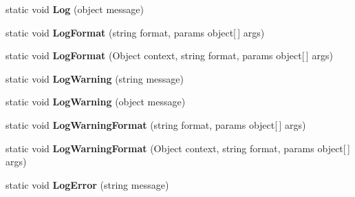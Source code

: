 \begin{DoxyCompactItemize}
\item 
\mbox{\label{class_lerp2_a_p_i_1_1_debug_handler_1_1_debug_a475bac2cd5b9b1be7c7b2b538f023536}} 
static void {\bfseries Log} (object message)
\item 
\mbox{\label{class_lerp2_a_p_i_1_1_debug_handler_1_1_debug_a9cb2534de671e4e858f133220c32419a}} 
static void {\bfseries Log\+Format} (string format, params object\mbox{[}$\,$\mbox{]} args)
\item 
\mbox{\label{class_lerp2_a_p_i_1_1_debug_handler_1_1_debug_a3b527f81ce961ce00998ea4e9e24b2cf}} 
static void {\bfseries Log\+Format} (Object context, string format, params object\mbox{[}$\,$\mbox{]} args)
\item 
\mbox{\label{class_lerp2_a_p_i_1_1_debug_handler_1_1_debug_a50dc997dfe0987dfe335879ebcb9cdb4}} 
static void {\bfseries Log\+Warning} (string message)
\item 
\mbox{\label{class_lerp2_a_p_i_1_1_debug_handler_1_1_debug_a3ed8d49babf01cb3f78bc33d794d782f}} 
static void {\bfseries Log\+Warning} (object message)
\item 
\mbox{\label{class_lerp2_a_p_i_1_1_debug_handler_1_1_debug_a02ab3c97ee4e24295d1280ed296c195b}} 
static void {\bfseries Log\+Warning\+Format} (string format, params object\mbox{[}$\,$\mbox{]} args)
\item 
\mbox{\label{class_lerp2_a_p_i_1_1_debug_handler_1_1_debug_a8bb95fdfb3059eb649b21bf4d41ba4d2}} 
static void {\bfseries Log\+Warning\+Format} (Object context, string format, params object\mbox{[}$\,$\mbox{]} args)
\item 
\mbox{\label{class_lerp2_a_p_i_1_1_debug_handler_1_1_debug_a099bcc1939e5e450931273b210261bda}} 
static void {\bfseries Log\+Error} (string message)
\item 
\mbox{\label{class_lerp2_a_p_i_1_1_debug_handler_1_1_debug_aecc855732fc0e79b08b479553947cf31}} 

\end{DoxyCompactItemize}
